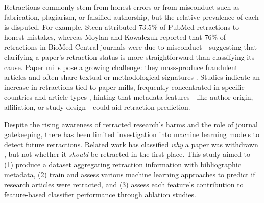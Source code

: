 \documentclass[pdflatex,sn-mathphys-num]{sn-jnl}%
\begin{document}
 Retractions commonly stem from honest errors or from misconduct such as fabrication, plagiarism, or falsified authorship, but the relative prevalence of each is disputed. For example, Steen \cite{steen_retractions_2011} attributed 73.5\% of PubMed retractions to honest mistakes, whereas Moylan and Kowalczuk \cite{moylan_why_2016} reported that 76\% of retractions in BioMed Central journals were due to misconduct—suggesting that clarifying a paper’s retraction status is more straightforward than classifying its cause. Paper mills pose a growing challenge: they mass-produce fraudulent articles and often share textual or methodological signatures \cite{doi:10.1126/science.342.6162.1035, doi:10.3138/jsp.49.3.02, publications4020009}. Studies indicate an increase in retractions tied to paper mills, frequently concentrated in specific countries and article types \cite{candal-pedreira_retracted_2022,gaudino_trends_2021,https://doi.org/10.1002/1873-3468.13747}, hinting that metadata features—like author origin, affiliation, or study design—could aid retraction prediction.

 Despite the rising awareness of retracted research’s harms and the role of journal gatekeeping, there has been limited investigation into machine learning models to detect future retractions. Related work has classified \emph{why} a paper was withdrawn \cite{rao_withdrarxiv_2024}, but not whether it \emph{should} be retracted in the first place. This study aimed to (1) produce a dataset aggregating retraction information with bibliographic metadata, (2) train and assess various machine learning approaches to predict if research articles were retracted, and (3) assess each feature's contribution to feature-based classifier performance through ablation studies.



\end{document}
